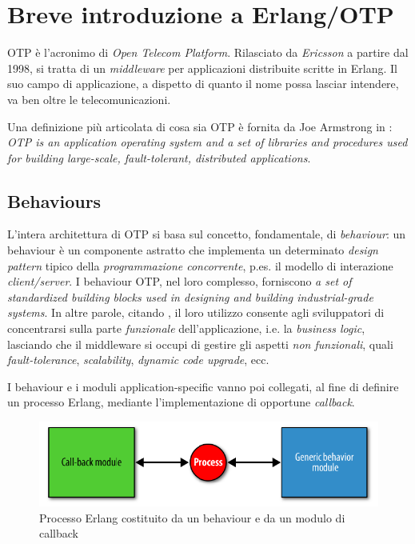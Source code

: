 %
\section{Breve introduzione a Erlang/OTP}%
OTP \`e l'acronimo di \emph{Open Telecom Platform}. Rilasciato da \emph{Ericsson} 
a partire dal 1998, si tratta di un \emph{middleware} per applicazioni distribuite 
scritte in Erlang\cite{erlang}. Il suo campo di applicazione, a dispetto di quanto 
il nome possa lasciar intendere, va ben oltre le telecomunicazioni.
%

%
Una definizione pi\`u articolata di cosa sia OTP \`e fornita da Joe Armstrong in 
\cite{armstrong07}: \emph{OTP is an application operating system and a set of libraries 
and procedures used for building large-scale, fault-tolerant, distributed applications}.
%

%
\subsection{Behaviours}
%
L'intera architettura di OTP si basa sul concetto, fondamentale, di \emph{behaviour}:
un behaviour \`e un componente astratto che implementa un determinato 
\emph{design pattern} tipico della \emph{programmazione concorrente}, p.es. il modello di 
interazione \emph{client/server}. 
%
I behaviour OTP, nel loro complesso, forniscono \emph{a set of standardized building 
blocks used in designing and building industrial-grade systems}\cite{cesarini09}.
%
In altre parole, citando \cite{armstrong07}, il loro utilizzo consente agli sviluppatori 
di concentrarsi sulla parte \emph{funzionale} dell'applicazione, i.e. la \emph{business logic}, 
lasciando che il middleware si occupi di gestire gli aspetti \emph{non funzionali}, quali 
\emph{fault-tolerance}, \emph{scalability}, \emph{dynamic code upgrade}, ecc.
%

%
I behaviour e i moduli application-specific vanno poi collegati, al fine di definire 
un processo Erlang, mediante l'implementazione di opportune \emph{callback}.
%
\begin{figure}[!h]
\centering
\includegraphics[width=400pt]{img/erl-behaviour.png}
\caption{Processo Erlang costituito da un behaviour e da un modulo di callback}
\end{figure}
%

